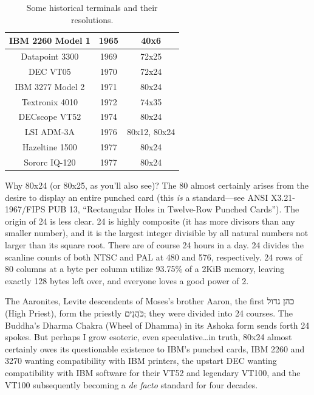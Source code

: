 \begin{table}[h]
\begin{center}
  \begin{tabular}{ |c|c|c| }
    \hline
    IBM 2260 Model 1 & 1965 & 40x6 \\
    \hline
    Datapoint 3300 & 1969 & 72x25 \\
    \hline
    DEC VT05 & 1970 & 72x24 \\
    \hline
    IBM 3277 Model 2 & 1971 & 80x24 \\
    \hline
    Textronix 4010 & 1972 & 74x35 \\
    \hline
    DECscope VT52 & 1974 & 80x24 \\
    \hline
    LSI ADM-3A & 1976 & 80x12, 80x24 \\
    \hline
    Hazeltine 1500 & 1977 & 80x24 \\
    \hline
    Sororc IQ-120 & 1977 & 80x24 \\
    \hline
  \end{tabular}
\caption{Some historical terminals and their resolutions.}
\end{center}
\end{table}

Why 80x24 (or 80x25, as you'll also see)\cite{infoworld80}? The 80 almost certainly arises from
the desire to display an entire punched card (this \textit{is} a standard---see
ANSI X3.21-1967/FIPS PUB 13, ``Rectangular Holes in Twelve-Row Punched
Cards'')\cite{sonicdelay}. The origin of 24 is less clear. 24 is highly
composite (it has more divisors than any smaller number), and it is the largest
integer divisible by all natural numbers not larger than its square root. There
are of course 24 hours in a day. 24 divides the scanline counts of both NTSC
and PAL at 480 and 576, respectively. 24 rows of 80 columns at a byte per
column utilize 93.75\% of a 2KiB memory, leaving exactly 128 bytes left over,
and everyone loves a good power of 2.

The Aaronites, Levite descendents of Moses's brother Aaron, the first
\texthebrew{כהן גדול}
(High Priest),
form the priestly \texthebrew{כֹּהֲנִים}; they were divided into 24 courses. The Buddha's Dharma Chakra (Wheel of Dhamma)
in its Ashoka form sends forth 24 spokes. But perhaps I grow esoteric, even
speculative\ldots in truth, 80x24 almost certainly owes its questionable
existence to IBM's punched cards, IBM 2260 and 3270 wanting compatibility with
IBM printers, the upstart DEC wanting compatibility with IBM software for their
VT52 and legendary VT100, and the VT100 subsequently becoming a \textit{de facto} standard for
four decades.

